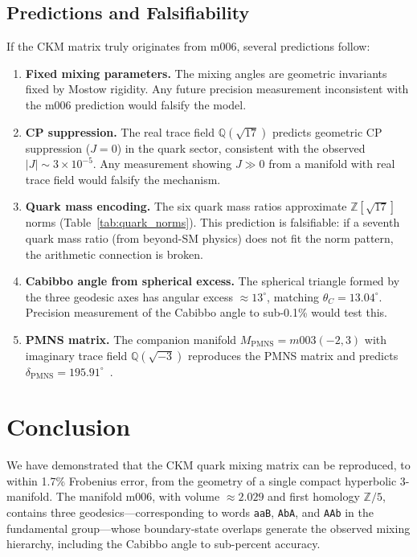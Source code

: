 \documentclass[11pt,a4paper]{article}
\begin{document}
\subsection{Predictions and Falsifiability}
\label{subsec:predictions}

If the CKM matrix truly originates from m006, several predictions follow:

\begin{enumerate}
\item \textbf{Fixed mixing parameters.} The mixing angles are geometric
invariants fixed by Mostow rigidity. Any future precision measurement
inconsistent with the m006 prediction would falsify the model.

\item \textbf{CP suppression.} The real trace field $\mathbb{Q}(\sqrt{17})$
predicts geometric CP suppression ($J=0$) in the quark sector, consistent
with the observed $|J|\sim3\times10^{-5}$. Any measurement showing
$J\gg0$ from a manifold with real trace field would falsify the mechanism.

\item \textbf{Quark mass encoding.} The six quark mass ratios
approximate $\mathbb{Z}[\sqrt{17}]$ norms (Table~\ref{tab:quark_norms}).
This prediction is falsifiable: if a seventh quark mass ratio (from
beyond-SM physics) does not fit the norm pattern, the arithmetic
connection is broken.

\item \textbf{Cabibbo angle from spherical excess.} The spherical
triangle formed by the three geodesic axes has angular excess
$\approx13^\circ$, matching $\theta_C=13.04^\circ$. Precision
measurement of the Cabibbo angle to sub-0.1\% would test this.

\item \textbf{PMNS matrix.} The companion manifold $M_{\mathrm{PMNS}}
=m003(-2,3)$ with imaginary trace field $\mathbb{Q}(\sqrt{-3})$
reproduces the PMNS matrix and predicts $\delta_{\mathrm{PMNS}}
=195.91^\circ$~\cite{Gentry:Unified}.
\end{enumerate}

\section{Conclusion}
\label{sec:conclusion}

We have demonstrated that the CKM quark mixing matrix can be reproduced, 
to within 1.7\% Frobenius error, from the geometry of a single compact 
hyperbolic 3-manifold. The manifold m006, with volume $\approx 2.029$ 
and first homology $\mathbb{Z}/5$, contains three geodesics---corresponding 
to words \texttt{aaB}, \texttt{AbA}, and \texttt{AAb} in the fundamental 
group---whose boundary-state overlaps generate the observed mixing 
hierarchy, including the Cabibbo angle to sub-percent accuracy.
\end{document}
